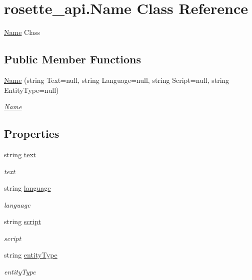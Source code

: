 \hypertarget{classrosette__api_1_1_name}{}\section{rosette\+\_\+api.\+Name Class Reference}
\label{classrosette__api_1_1_name}


\hyperlink{classrosette__api_1_1_name}{Name} Class  


\subsection*{Public Member Functions}
\begin{DoxyCompactItemize}
\item 
\hyperlink{classrosette__api_1_1_name_a3ef4ca325b3c10914173b6f615ccc1f4}{Name} (string Text=null, string Language=null, string Script=null, string Entity\+Type=null)
\begin{DoxyCompactList}\small\item\em \hyperlink{classrosette__api_1_1_name}{Name} \end{DoxyCompactList}\end{DoxyCompactItemize}
\subsection*{Properties}
\begin{DoxyCompactItemize}
\item 
string \hyperlink{classrosette__api_1_1_name_aea41eeac4d108ba05e5b2857f41752e5}{text}
\begin{DoxyCompactList}\small\item\em text \end{DoxyCompactList}\item 
string \hyperlink{classrosette__api_1_1_name_ad3b22b7edc76c5494e4ade85ea007889}{language}
\begin{DoxyCompactList}\small\item\em language \end{DoxyCompactList}\item 
string \hyperlink{classrosette__api_1_1_name_a5e9aba5fc1f32ad0fcf6e0bf14ce7afd}{script}
\begin{DoxyCompactList}\small\item\em script \end{DoxyCompactList}\item 
string \hyperlink{classrosette__api_1_1_name_afae65803ecc7dd2b6f52a534fd343a7e}{entity\+Type}
\begin{DoxyCompactList}\small\item\em entity\+Type \end{DoxyCompactList}\end{DoxyCompactItemize}


